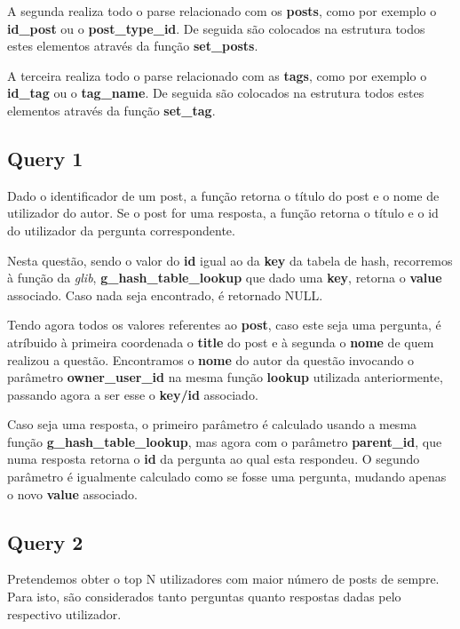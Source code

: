 \documentclass[a4paper]{article}
\begin{document}
A segunda realiza todo o parse relacionado com os \textbf{posts}, 
como por exemplo o \textbf{id\_post} ou o \textbf{post\_type\_id}. 
De seguida são colocados na estrutura todos estes elementos através da 
função \textbf{set\_posts}.

A terceira realiza todo o parse relacionado com as \textbf{tags}, 
como por exemplo o \textbf{id\_tag} ou o \textbf{tag\_name}. 
De seguida são colocados na estrutura todos estes elementos através da 
função \textbf{set\_tag}.

\subsection{Query 1}

Dado o identificador de um post, a função retorna o título do post 
e o nome de utilizador do autor. Se o post for uma resposta, a função
retorna o título e o id do utilizador da pergunta correspondente.

Nesta questão, sendo o valor do \textbf{id} igual ao da \textbf{key} 
da tabela de hash, recorremos à função da \textit{glib},
\textbf{g\_hash\_table\_lookup} que dado uma \textbf{key},
retorna o \textbf{value} associado. Caso nada seja encontrado,
é retornado NULL.

Tendo agora todos os valores referentes ao \textbf{post}, caso este
seja uma pergunta, é atríbuido à primeira coordenada o \textbf{title}
do post e à segunda o \textbf{nome} de quem realizou a questão.
Encontramos o \textbf{nome} do autor da questão invocando o parâmetro
\textbf{owner\_user\_id} na mesma função \textbf{lookup} utilizada 
anteriormente, passando agora a ser esse o \textbf{key/id} associado.

Caso seja uma resposta, o primeiro parâmetro é calculado usando a mesma 
função \textbf{g\_hash\_table\_lookup}, mas agora com o 
parâmetro \textbf{parent\_id}, que numa resposta retorna o \textbf{id} 
da pergunta ao qual esta respondeu. O segundo parâmetro é igualmente
calculado como se fosse uma pergunta, mudando apenas o novo 
\textbf{value} associado.

\subsection{Query 2}

Pretendemos obter o top N utilizadores com maior número de posts de 
sempre. Para isto, são considerados tanto perguntas quanto respostas 
dadas pelo respectivo utilizador.
\end{document}
